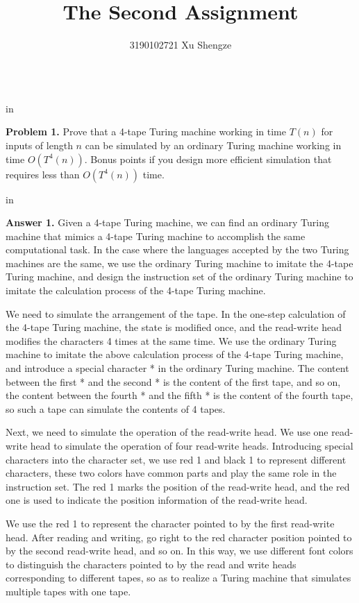 \documentclass[11pt]{article}
\begin{document}
\title{{\bf The Second Assignment}}
\author{3190102721 Xu Shengze}
\date{}
\maketitle

\begin{tabular*}{13cm}{r}
\hline
\end{tabular*}

 in

{\bf Problem 1.} Prove that a 4-tape Turing machine working in time $T(n)$ for inputs of length $n$ can be simulated by an ordinary Turing machine working in time $O(T^4(n))$. Bonus points if you design more efficient simulation that requires less than $O(T^4(n))$ time.

 in

{\bf Answer 1.} Given a 4-tape Turing machine, we can find an ordinary Turing machine that mimics a 4-tape Turing machine to accomplish the same computational task. In the case where the languages accepted by the two Turing machines are the same, we use the ordinary Turing machine to imitate the 4-tape Turing machine, and design the instruction set of the ordinary Turing machine to imitate the calculation process of the 4-tape Turing machine.

We need to simulate the arrangement of the tape. In the one-step calculation of the 4-tape Turing machine, the state is modified once, and the read-write head modifies the characters 4 times at the same time. We use the ordinary Turing machine to imitate the above calculation process of the 4-tape Turing machine, and introduce a special character * in the ordinary Turing machine. The content between the first * and the second * is the content of the first tape, and so on, the content between the fourth * and the fifth * is the content of the fourth tape, so such a tape can simulate the contents of 4 tapes.

Next, we need to simulate the operation of the read-write head. We use one read-write head to simulate the operation of four read-write heads. Introducing special characters into the character set, we use red 1 and black 1 to represent different characters, these two colors have common parts and play the same role in the instruction set. The red 1 marks the position of the read-write head, and the red one is used to indicate the position information of the read-write head.

We use the red 1 to represent the character pointed to by the first read-write head. After reading and writing, go right to the red character position pointed to by the second read-write head, and so on. In this way, we use different font colors to distinguish the characters pointed to by the read and write heads corresponding to different tapes, so as to realize a Turing machine that simulates multiple tapes with one tape.
\end{document}
